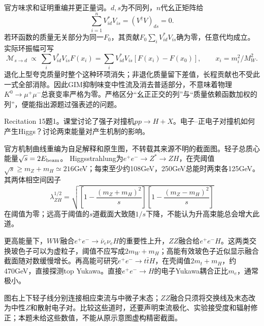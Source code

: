 \begin{solution}
官方味求和证明重编并更正量词。$d,s$为不同列，$n$代幺正矩阵给
\begin{equation}
 \sum_{i=1}^{n}V_{id}^*V_{is}=(V^\dagger V)_{ds}=0.
\end{equation}
若环函数的质量无关部分为同一$F_0$，其贡献$F_0\sum_iV_{id}^*V_{is}$确为零，任意代均成立。实际环振幅可写
\begin{equation}
 \mathcal M_{s\to d}\ \propto\ \sum_iV_{id}^*V_{is}F(x_i)
 =\sum_iV_{id}^*V_{is}[F(x_i)-F(x_0)],\qquad x_i=m_i^2/M_W^2.
\end{equation}
退化上型夸克质量时整个这种环项消失；非退化质量留下差值，长程贡献也不受此一式全部消除。因此GIM抑制味变中性流及消去普适部分，不意味着物理$K^0\to\mu^+\mu^-$总衰变率严格为零。严格区分“幺正正交的列”与“质量依赖函数加权的列”，便能指出源题过强表述的问题。
\end{solution}
\begin{exercise}\label{ex:rec-15-1}
Recitation 15题1。课堂讨论了强子对撞机$pp\to H+X$。电子--正电子对撞机如何产生Higgs？讨论两束能量对产生机制的影响。
\end{exercise}
\begin{solution}
官方机制曲线重编为自足解释和原生图，不转载其来源不明的截面图。轻子总质心能量$\sqrt s=2E_{\rm beam}$。
Higgsstrahlung为$e^+e^-\to Z^*\to ZH$，在壳阈值$\sqrt s\ge m_Z+m_H\simeq216$GeV；每束至少约108GeV，250GeV总能时两束各125GeV。其两体相空间因子
\begin{equation}
 \lambda_{ZH}^{1/2}=\sqrt{\left[1-\frac{(m_Z+m_H)^2}{s}\right]
 \left[1-\frac{(m_Z-m_H)^2}{s}\right]}
\end{equation}
在阈值为零；远高于阈值的$s$道截面大致随$1/s$下降，不能认为升高束能总会增大此道。

更高能量下，$WW$融合$e^+e^-\to\bar\nu_e\nu_eH$的重要性上升，$ZZ$融合给$e^+e^-H$。这两类交换玻色子可以为虚粒子，阈值不应写成$2m_W+m_H$；高能有效玻色子近似显示融合截面随对数缓慢增长。再高能可研究$e^+e^-\to t\bar tH$，在壳阈值$2m_t+m_H$，约470GeV，直接探测top Yukawa。直接$e^+e^-\to H$的电子Yukawa耦合正比$m_e$，通常极小。
\begin{center}\end{center}
图右上下轻子线分别连接相应束流与中微子末态；$ZZ$融合只须将交换线及末态改为中性$Z$和散射电子对。比较这些道时，还要声明束流极化、实验接受度和辐射修正；本题未给这些数值，不能从原示意图虚构精密截面。
\end{solution}
